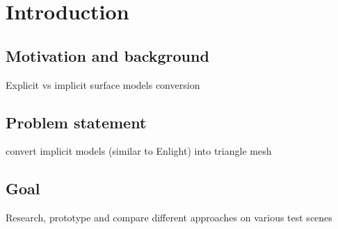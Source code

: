 \chapter{Introduction}

\section{Motivation and background}
Explicit vs implicit surface models
conversion


\section{Problem statement}
convert implicit models (similar to Enlight) into triangle mesh

\section{Goal}
Research, prototype and compare different approaches on various test scenes
